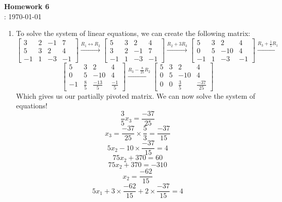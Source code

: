 \documentclass[12pt]{article}
\title{}
\author{Josh Morales}
\date{\today}
\begin{document}
\pagestyle{fancy}
\begin{center}
\textbf{\Large Homework 6} \\
: \today
\end{center}
\begin{enumerate}[leftmargin=2em]
    \item 
    To solve the system of linear equations, we can create the following matrix:
    \[
    \left[ \begin{array}{ccc|c}
        3 & 2 & -1 & 7 \\
        5 & 3 & 2 & 4 \\
        -1 & 1 & -3 & -1
    \end{array} \right]
    \xrightarrow{R_1 \leftrightarrow R_2}
    \left[ \begin{array}{ccc|c}
        5 & 3 & 2 & 4 \\
        3 & 2 & -1 & 7 \\
        -1 & 1 & -3 & -1
    \end{array} \right]
    \xrightarrow{R_2 + 3R_3}
    \left[ \begin{array}{ccc|c}
        5 & 3 & 2 & 4 \\
        0 & 5 & -10 & 4 \\
        -1 & 1 & -3 & -1
    \end{array} \right]
    \xrightarrow{R_3 + \frac{1}{5}R_1}
    \]
    \[
    \left[ \begin{array}{ccc|c}
        5 & 3 & 2 & 4 \\
        0 & 5 & -10 & 4 \\
        -1 & \frac{8}{5} & \frac{-13}{5} & \frac{-1}{5}
    \end{array} \right]
    \xrightarrow{R_3 - \frac{8}{25}R_2}
    \left[ \begin{array}{ccc|c}
        5 & 3 & 2 & 4 \\
        0 & 5 & -10 & 4 \\
        0 & 0 & \frac{3}{5} & \frac{-37}{25}
    \end{array} \right]
    \]
    Which gives us our partially pivoted matrix. We can now solve the system of equations! 
    \[\frac{3}{5}x_3 = \frac{-37}{25}\]
    \[x_3 = \frac{-37}{25}\times\frac{5}{3} = \frac{-37}{15}\]
    \[5x_2-10 \times \frac{-37}{15} = 4\]
    \[75x_2 + 370 = 60\]
    \[75x_2 + 370 = -310\]
    \[x_2 = \frac{-62}{15}\]
    \[5x_1 + 3 \times \frac{-62}{15} + 2 \times \frac{-37}{15} = 4\]

\end{enumerate}
\end{document}
